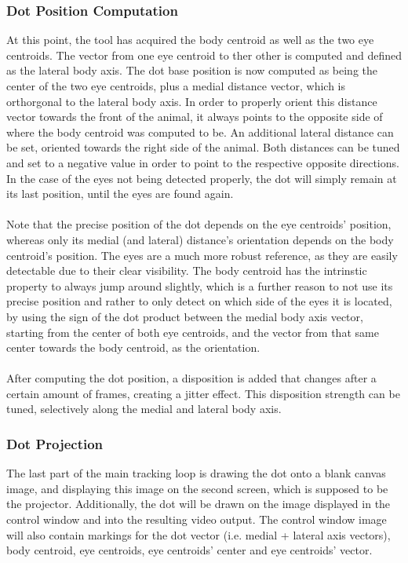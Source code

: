 \documentclass[12pt]{article}
\begin{document}
\subsubsection*{Dot Position Computation}
At this point, the tool has acquired the body centroid as well as the two eye centroids. The vector from one eye centroid to ther other is computed and defined as the lateral body axis. The dot base position is now computed as being the center of the two eye centroids, plus a medial distance vector, which is orthorgonal to the lateral body axis. In order to properly orient this distance vector towards the front of the animal, it always points to the opposite side of where the body centroid was computed to be. An additional lateral distance can be set, oriented towards the right side of the animal. Both distances can be tuned and set to a negative value in order to point to the respective opposite directions.\\
In the case of the eyes not being detected properly, the dot will simply remain at its last position, until the eyes are found again.\\
\\
Note that the precise position of the dot depends on the eye centroids' position, whereas only its medial (and lateral) distance's orientation depends on the body centroid's position. The eyes are a much more robust reference, as they are easily detectable due to their clear visibility. The body centroid has the intrinstic property to always jump around slightly, which is a further reason to not use its precise position and rather to only detect on which side of the eyes it is located, by using the sign of the dot product between the medial body axis vector, starting from the center of both eye centroids, and the vector from that same center towards the body centroid, as the orientation.\\
\\
After computing the dot position, a disposition is added that changes after a certain amount of frames, creating a jitter effect. This disposition strength can be tuned, selectively along the medial and lateral body axis.

\subsubsection*{Dot Projection}
The last part of the main tracking loop is drawing the dot onto a blank canvas image, and displaying this image on the second screen, which is supposed to be the projector. Additionally, the dot will be drawn on the image displayed in the control window and into the resulting video output. The control window image will also contain markings for the dot vector (i.e. medial + lateral axis vectors), body centroid, eye centroids, eye centroids' center and eye centroids' vector.
\end{document}
